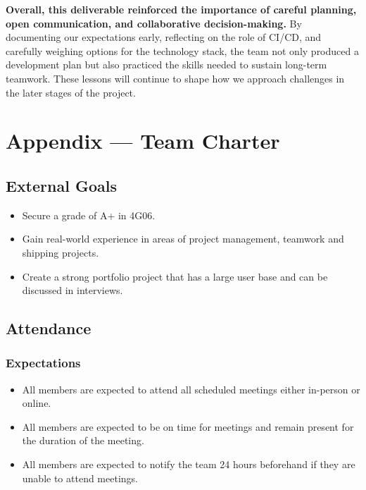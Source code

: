 \documentclass{article}
\begin{document}
\noindent
\textbf{Overall, this deliverable reinforced the importance of careful planning, open communication, and collaborative decision-making.} By documenting our expectations early, reflecting on the role of CI/CD, and carefully weighing options for the technology stack, the team not only produced a development plan but also practiced the skills needed to sustain long-term teamwork. These lessons will continue to shape how we approach challenges in the later stages of the project.

\newpage{}

\section*{Appendix --- Team Charter}

\subsection*{External Goals}
\begin{itemize}
    \item Secure a grade of A+ in 4G06.
    \item Gain real-world experience in areas of project management, teamwork and shipping projects.
    \item Create a strong portfolio project that has a large user base and can be discussed in interviews.  
\end{itemize}


\subsection*{Attendance}

\subsubsection*{Expectations}
\begin{itemize}
    \item All members are expected to attend all scheduled meetings either in-person or online.
    \item All members are expected to be on time for meetings and remain present for the duration of the meeting.
    \item All members are expected to notify the team 24 hours beforehand if they are unable to attend meetings.
\end{itemize}
\end{document}
